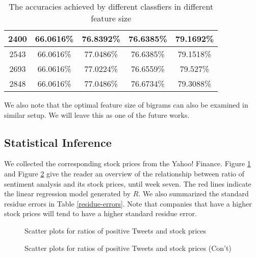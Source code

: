 \documentclass[12pt]{article}
\begin{document}
\begin{table}
\begin{center}
\begin{tabular}{ | c || c | c | c | c | }
        2400 & 66.0616\% & 76.8392\% & 76.6385\% & 79.1692\% \\ \hline
        2543 & 66.0616\% & 77.0486\% & 76.6385\% & 79.1518\% \\ \hline
        2693 & 66.0616\% & 77.0224\% & 76.6559\% & 79.527\% \\ \hline
        2848 & 66.0616\% & 77.0486\% & 76.6734\% & 79.3088\% \\ \hline
    \end{tabular}
\caption{The accuracies achieved by different classfiers in different feature size}
\label{classifiers-feature-size-tbl}
\end{center}
\end{table}


We also note that the optimal feature size of bigrams can also be examined in similar setup. We will leave this as one of the future works.

\subsection{Statistical Inference}
We collected the corresponding stock prices from the Yahoo! Finance. Figure \ref{xyplots-ratio-price} and Figure \ref{xyplots-ratio-price-02} give the reader an overview of the relationship between ratio of sentiment analysis and its stock prices, until week seven. The red lines indicate the linear regression model generated by $R$. We also summarized the standard residue errors in Table \ref{residue-errors}. Note that companies that have a higher stock prices will tend to have a higher standard residue error.

\begin{figure}
\centering
\caption{Scatter plots for ratios of positive Tweets and stock prices}
\label{xyplots-ratio-price}
\end{figure}

\begin{figure}
\centering
\caption{Scatter plots for ratios of positive Tweets and stock prices (Con't)}
\label{xyplots-ratio-price-02}
\end{figure}
\end{document}
